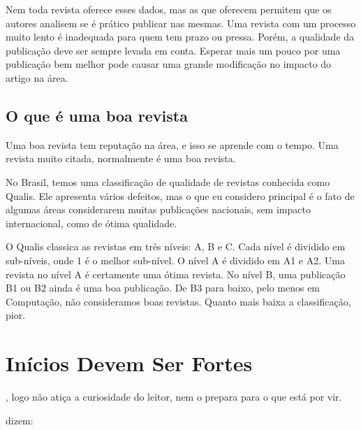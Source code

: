 \documentclass[openany]{book}
\begin{document}

 Nem toda revista oferece esses dados, mas as que oferecem permitem que os autores analisem se é prático publicar nas mesmas. Uma revista com um processo muito lento é inadequada para quem tem prazo ou pressa. Porém, a qualidade da publicação deve ser sempre levada em conta. Esperar mais um pouco por uma publicação bem melhor pode causar uma grande modificação no impacto do artigo na área.

\section{O que é uma boa revista}

Uma boa revista tem reputação na área, e isso se aprende com o tempo. Uma revista muito citada, normalmente é uma boa revista.

No Brasil, temos uma classificação de qualidade de revistas conhecida como Qualis. Ele apresenta vários defeitos, mas o que eu considero principal é o fato de algumas áreas considerarem muitas publicações nacionais, sem impacto internacional, como de ótima qualidade.

O Qualis classica as revistas em três níveis: A, B e C. Cada nível é dividido em sub-níveis, onde 1 é o melhor sub-nível. O nível A é dividido em A1 e A2. Uma revista no nível A é certamente uma ótima revista. No nível B, uma publicação B1 ou B2 ainda é uma boa publicação. De B3 para baixo, pelo menos em Computação, não consideramos boas revistas. Quanto mais baixa a classificação, pior.





\chapter{Inícios Devem Ser Fortes}

, logo não atiça a curiosidade do leitor, nem o prepara para o que está por vir.

\citeauthor{Knuth:1997} dizem:

\end{document}
